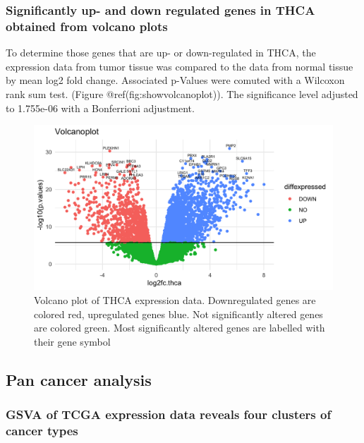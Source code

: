 \documentclass[
]{article}
\begin{document}
\hypertarget{significantly-up--and-down-regulated-genes-in-thca-obtained-from-volcano-plots}{%
\subsubsection{Significantly up- and down regulated genes in THCA
obtained from volcano
plots}\label{significantly-up--and-down-regulated-genes-in-thca-obtained-from-volcano-plots}}

To determine those genes that are up- or down-regulated in THCA, the
expression data from tumor tissue was compared to the data from normal
tissue by mean log2 fold change. Associated p-Values were comuted with a
Wilcoxon rank sum test. (Figure @ref(fig:showvolcanoplot)). The
significance level adjusted to 1.755e-06 with a Bonferrioni adjustment.

\begin{figure}

{\centering \includegraphics[width=1\linewidth]{figures/Volcanoplot} 

}

\caption{Volcano plot of THCA expression data. Downregulated genes are colored red, upregulated genes blue. Not significantly altered genes are colored green. Most significantly altered genes are labelled with their gene symbol}\label{fig:showvolcanoplot}
\end{figure}

\hypertarget{pan-cancer-analysis}{%
\subsection{Pan cancer analysis}\label{pan-cancer-analysis}}

\hypertarget{gsva-of-tcga-expression-data-reveals-four-clusters-of-cancer-types}{%
\subsubsection{GSVA of TCGA expression data reveals four clusters of
cancer
types}\label{gsva-of-tcga-expression-data-reveals-four-clusters-of-cancer-types}}
\end{document}
